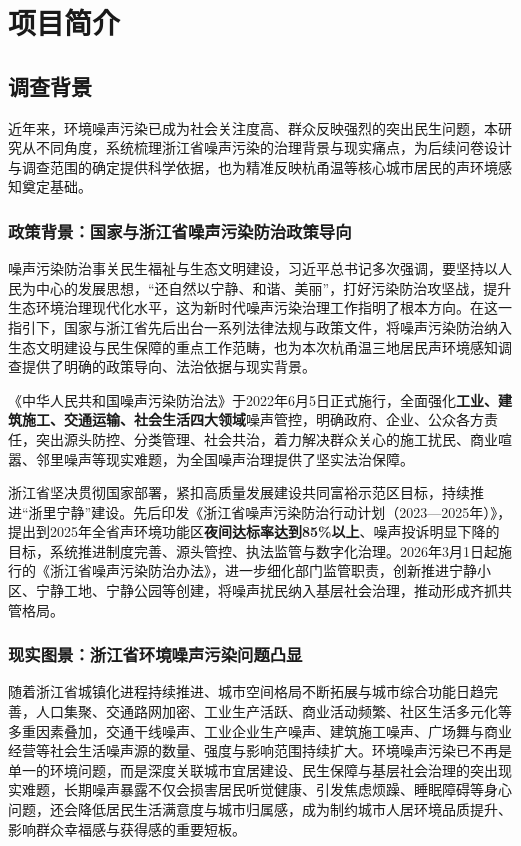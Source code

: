 \section{项目简介}

\subsection{调查背景}

近年来，环境噪声污染已成为社会关注度高、群众反映强烈的突出民生问题，本研究从不同角度，系统梳理浙江省噪声污染的治理背景与现实痛点，为后续问卷设计与调查范围的确定提供科学依据，也为精准反映杭甬温等核心城市居民的声环境感知奠定基础。

\subsubsection{政策背景：国家与浙江省噪声污染防治政策导向}

噪声污染防治事关民生福祉与生态文明建设，习近平总书记多次强调，要坚持以人民为中心的发展思想，“还自然以宁静、和谐、美丽”，打好污染防治攻坚战，提升生态环境治理现代化水平，这为新时代噪声污染治理工作指明了根本方向。在这一指引下，国家与浙江省先后出台一系列法律法规与政策文件，将噪声污染防治纳入生态文明建设与民生保障的重点工作范畴，也为本次杭甬温三地居民声环境感知调查提供了明确的政策导向、法治依据与现实背景。

《中华人民共和国噪声污染防治法》于2022年6月5日正式施行，全面强化\textbf{工业、建筑施工、交通运输、社会生活四大领域}噪声管控，明确政府、企业、公众各方责任，突出源头防控、分类管理、社会共治，着力解决群众关心的施工扰民、商业喧嚣、邻里噪声等现实难题，为全国噪声治理提供了坚实法治保障。

浙江省坚决贯彻国家部署，紧扣高质量发展建设共同富裕示范区目标，持续推进“浙里宁静”建设。先后印发《浙江省噪声污染防治行动计划（2023—2025年）》，提出到2025年全省声环境功能区\textbf{夜间达标率达到85\%以上}、噪声投诉明显下降的目标，系统推进制度完善、源头管控、执法监管与数字化治理。2026年3月1日起施行的《浙江省噪声污染防治办法》，进一步细化部门监管职责，创新推进宁静小区、宁静工地、宁静公园等创建，将噪声扰民纳入基层社会治理，推动形成齐抓共管格局。

\subsubsection{现实图景：浙江省环境噪声污染问题凸显}

随着浙江省城镇化进程持续推进、城市空间格局不断拓展与城市综合功能日趋完善，人口集聚、交通路网加密、工业生产活跃、商业活动频繁、社区生活多元化等多重因素叠加，交通干线噪声、工业企业生产噪声、建筑施工噪声、广场舞与商业经营等社会生活噪声源的数量、强度与影响范围持续扩大。环境噪声污染已不再是单一的环境问题，而是深度关联城市宜居建设、民生保障与基层社会治理的突出现实难题，长期噪声暴露不仅会损害居民听觉健康、引发焦虑烦躁、睡眠障碍等身心问题，还会降低居民生活满意度与城市归属感，成为制约城市人居环境品质提升、影响群众幸福感与获得感的重要短板。

